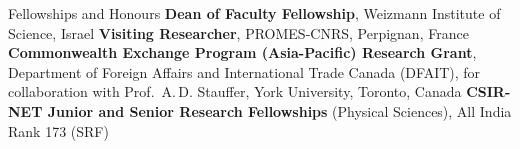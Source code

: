 \begin{rubric}{Fellowships and Honours}
\entry*[2018] \textbf{Dean of Faculty Fellowship}, Weizmann Institute of Science, Israel
\entry*[2014] \textbf{Visiting Researcher}, PROMES-CNRS, Perpignan, France
\entry*[2010] \textbf{Commonwealth Exchange Program (Asia-Pacific) Research Grant}, Department of Foreign Affairs and International Trade Canada (DFAIT), for collaboration with Prof.\ A.\,D. Stauffer, York University, Toronto, Canada
\entry*[2008, 2010] \textbf{CSIR-NET Junior and Senior Research Fellowships} (Physical Sciences), All India Rank 173 (SRF)
\end{rubric}
